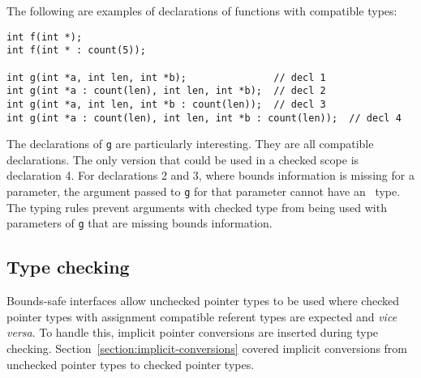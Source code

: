 The following are examples of declarations of functions with compatible types:
\begin{lstlisting}
int f(int *);
int f(int * : count(5));

int g(int *a, int len, int *b);               // decl 1
int g(int *a : count(len), int len, int *b);  // decl 2
int g(int *a, int len, int *b : count(len));  // decl 3
int g(int *a : count(len), int len, int *b : count(len));  // decl 4
\end{lstlisting}
The declarations of \texttt{g} are particularly interesting. They are all
compatible declarations.  The only version
that could be used in a checked scope is declaration 4.   For declarations 2 and 3,
where bounds information is missing for a parameter, the argument passed to \texttt{g}
for that parameter cannot have an \arrayptr\ type.  The typing rules prevent arguments
with checked type from being used with parameters of \texttt{g} that are missing
bounds information.

\subsection{Type checking}
\label{section:bounds-safe-interface-type-checking}

Bounds-safe interfaces allow unchecked pointer types to be used
where checked pointer types with assignment compatible referent types are
expected and {\it vice versa}.
To handle this, implicit pointer conversions are inserted during type checking.
Section~\ref{section:implicit-conversions} covered implicit conversions from unchecked pointer types to checked pointer types.

